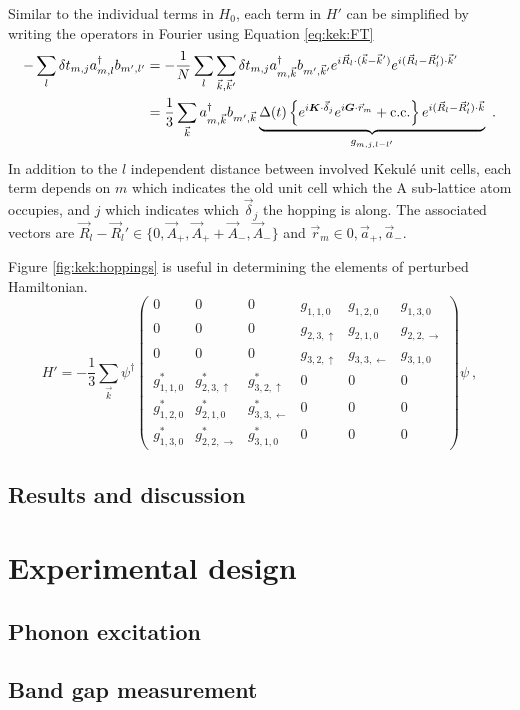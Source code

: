Similar to the individual terms in $H_0$, each term in $H'$ can be simplified by writing the operators in Fourier using Equation \ref{eq:kek:FT} 
\begin{align*}
	- \sum_{l} \delta t_{m,j} a^{\dagger}_{m,l} b_{m',l'} &= 
	    -\frac{1}{N}\sum_l \sum_{\vec{k},\vec{k}'} \delta t_{m,j} a^{\dagger}_{m,\vec{k}} b_{m',\vec{k}'} 
	    e^{i \vec{R}_l \cdot (\vec{k}-\vec{k}')} e^{i(\vec{R}_l-\vec{R}_l')\cdot \vec{k}'} \\
	    &= \frac{1}{3}  \sum_{\vec{k}} a^{\dagger}_{m,\vec{k}} b_{m',\vec{k}} 
	    	\underbrace{ \Delta (t) \left\{ e^{i \bm{K} \cdot \vec{\delta}_j} e^{i \bm{G} \cdot \vec{r}_{m}}+\text{c.c.} \right\} e^{i(\vec{R}_l-\vec{R}_l')\cdot \vec{k}}}_{g_{m,j,l-l'}} \ .
\end{align*}
In addition to the $l$ independent distance between involved Kekul\'e unit cells, each term depends on $m$ which indicates the old unit cell which the A sub-lattice atom occupies, and $j$ which indicates which $\vec{\delta}_j$ the hopping is along.
The associated vectors are $\vec{R}_l-\vec{R}_l' \in \{ 0, \vec{A}_+, \vec{A}_+ +\vec{A}_-,\vec{A}_- \}$ and $\vec{r}_m \in {0, \vec{a}_+,\vec{a}_-}$.

Figure \ref{fig:kek:hoppings} is useful in determining the elements of perturbed Hamiltonian.
\begin{equation*}
	H'=-\frac{1}{3} \sum_{\vec{k}} \psi^{\dagger} 
	\left(\begin{array}{cccccc}
		0           & 0                     & 0                    & g_{1,1,0}        & g_{1,2,0}          & g_{1,3,0} \\
		0           & 0                     & 0                    & g_{2,3,\uparrow} & g_{2,1,0}          & g_{2,2,\rightarrow} \\
		0           & 0                     & 0                    & g_{3,2,\uparrow} & g_{3,3,\leftarrow} & g_{3,1,0} \\
		g_{1,1,0}^* & g_{2,3,\uparrow}^*    & g_{3,2,\uparrow}^*   & 0            & 0              & 0 \\
		g_{1,2,0}^* & g_{2,1,0}^*           & g_{3,3,\leftarrow}^* & 0            & 0              & 0 \\
		g_{1,3,0}^* & g_{2,2,\rightarrow}^* & g_{3,1,0}^*          & 0            & 0              & 0 
	\end{array}\right)
	\psi \ ,
\end{equation*}

\subsection{Results and discussion}

\section{Experimental design}
\subsection{Phonon excitation}
\subsection{Band gap measurement}